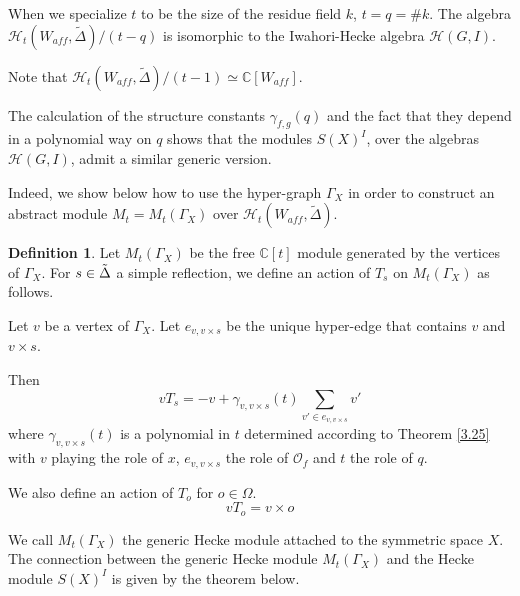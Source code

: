 \documentclass[12pt]{article}
\newcommand{\s}{\mathcal{O}}
\newcommand{\<}{\langle}
\renewcommand{\>}{\rangle}
\theoremstyle{plain}
\theoremstyle{definition}
\newtheorem{defn}[theorem]{Definition} %
\begin{document}
When we specialize $t$ to be the size of the residue field $k$, $t=q=\#k$. The algebra $\mathcal{H}_{t}(W_{aff},\tilde{\Delta})/(t-q)$ is isomorphic to the Iwahori-Hecke algebra $\mathcal{H}(G,I)$. 

Note that $\mathcal{H}_{t}(W_{aff},\tilde{\Delta})/(t-1) \simeq \mathbb{C}[W_{aff}].$


The calculation of the structure constants $\gamma_{f,g}(q)$ and the fact that they depend in a polynomial way on $q$ shows that the modules $S(X)^{I}$, over the algebras $\mathcal{H}(G,I)$, admit a similar generic version. 

Indeed, we show below how to use the hyper-graph $\Gamma_X$ in order to construct an abstract module $M_t=M_{t}(\Gamma_X)$ over $\mathcal{H}_{t}(W_{aff},\tilde{\Delta})$. 

\begin{defn}
Let $M_{t}(\Gamma_X)$ be the free $\mathbb{C}[t]$ module generated by the vertices of $\Gamma_X$. For $s\in \Tilde{\Delta}$ a simple reflection, we define an action of $T_s$ on $M_{t}(\Gamma_X)$ as follows.

Let $v$ be a vertex of $\Gamma_X$. Let $e_{v,v\times s}$ be the unique hyper-edge that contains $v$ and $v\times s$. 

Then $$vT_s=-v+\gamma_{v,v\times s}(t)\sum_{v'\in e_{v,v\times s}}v'$$  where $\gamma_{v,v\times s}(t)$ is a polynomial in $t$ determined according to Theorem \ref{3.25} with $v$ playing the role of $x$, $e_{v,v\times s}$ the role of $\s_f$ and $t$ the role of $q$.

We also define an action of $T_o$ for $o\in \Omega$. $$ vT_o= v\times o$$
\end{defn}



We call $M_{t}(\Gamma_X)$ the generic Hecke module attached to the symmetric space $X$. 
The connection between the generic Hecke module $M_{t}(\Gamma_X)$  and the Hecke module $S(X)^I$ is given by the theorem below.
\end{document}
